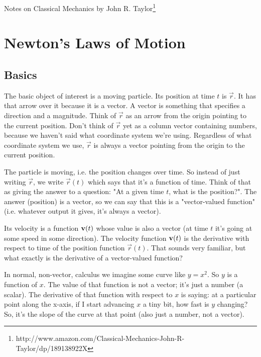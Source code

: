 \newcommand{\xhat}{\vec{\hat{x}}}
\renewcommand{\yhat}{\vec{\hat{y}}}
\newcommand{\zhat}{\vec{\hat{z}}}
\newcommand{\rhat}{\vec{\hat{r}}}
\newcommand{\phihat}{\vec{\hat{\phi}}}
\renewcommand{\a}{\vec{a}}
\renewcommand{\b}{\vec{b}}
\renewcommand{\p}{\vec{p}}
\renewcommand{\F}{\vec{F}}
\renewcommand{\r}{\vec{r}}
\renewcommand{\vector}[1]{\begin{bmatrix}#1\end{bmatrix}}


Notes on Classical Mechanics by John R. Taylor\footnote{http://www.amazon.com/Classical-Mechanics-John-R-Taylor/dp/189138922X}


\section{Newton's Laws of Motion}






\subsection{Basics}

The basic object of interest is a moving particle. Its position at time $t$ is
$\r$. It has that arrow over it because it is a vector. A vector is something
that specifies a direction and a magnitude. Think of $\r$ as an arrow from the
origin pointing to the current position. Don't think of $\r$ yet as a column
vector containing numbers, because we haven't said what coordinate system we're
using. Regardless of what coordinate system we use, $\r$ is always a vector
pointing from the origin to the current position.

The particle is moving, i.e. the position changes over time. So instead of just
writing $\r$, we write $\r(t)$ which says that it's a function of time. Think
of that as giving the answer to a question: "At a given time $t$, what is the
position?". The answer (position) is a vector, so we can say that this is a
"vector-valued function" (i.e. whatever output it gives, it's always a vector).

Its velocity is a function $\mathbf v(t)$ whose value is also a vector (at time $t$
it's going at some speed in some direction). The velocity function $\mathbf v(t)$ is
the derivative with respect to time of the position function $\r(t)$. That
sounds very familiar, but what exactly is the derivative of a vector-valued
function?

In normal, non-vector, calculus we imagine some curve like $y = x^2$. So $y$ is
a function of $x$. The value of that function is not a vector; it's just a
number (a scalar). The derivative of that function with respect to $x$ is
saying: at a particular point along the x-axis, if I start advancing $x$ a tiny
bit, how fast is $y$ changing? So, it's the slope of the curve at that point
(also just a number, not a vector).

